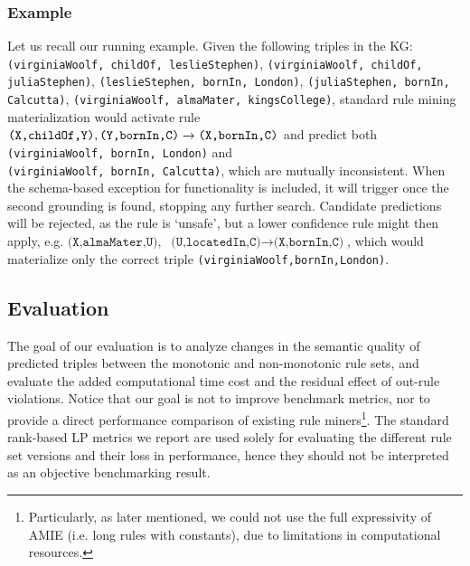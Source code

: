 \documentclass[a4paper,UKenglish,cleveref, autoref, thm-restate]{tgdk-v2021}
\begin{document}
\subsubsection{Example}  Let us recall our running example. Given the following triples in the KG: \texttt{(virginiaWoolf, childOf, leslieStephen)}, \texttt{(virginiaWoolf, childOf, juliaStephen)}, \texttt{(leslieStephen, bornIn, London)}, \texttt{(juliaStephen, bornIn, Calcutta)}, \texttt{(virginiaWoolf, almaMater, kingsCollege)}, standard rule mining materialization would activate rule $\texttt{(X,childOf,Y)}, \texttt{(Y,bornIn,C)} \rightarrow \\ \texttt{(X,bornIn,C)}$ and predict both \texttt{(virginiaWoolf, bornIn, London)} and\\ \texttt{(virginiaWoolf, bornIn, Calcutta)}, which are mutually inconsistent. When the schema-based exception for functionality is included, it will trigger once the second grounding is found, stopping any further search. Candidate predictions will be rejected, as the rule is `unsafe', but a lower confidence rule might then apply, e.g. $\texttt{(X,almaMater,U)}, $ $\texttt{(U,locatedIn,C)} \rightarrow \texttt{(X,bornIn,C)}$, which would materialize only the correct triple \texttt{(virginiaWoolf,bornIn,London)}. 
\subsection{Evaluation}


The goal of our evaluation is to analyze changes in the semantic quality of predicted triples between the monotonic and non-monotonic rule sets, and evaluate the added computational time cost and the residual effect of out-rule violations. Notice that our goal is not to improve benchmark metrics, nor to provide a direct performance comparison of existing rule miners\footnote{Particularly, as later mentioned, we could not use the full expressivity of AMIE (i.e. long rules with constants), due to limitations in computational resources.}. The  standard rank-based LP metrics we  report are used solely for evaluating the different rule set versions and their loss in performance, hence they should not be interpreted as an objective benchmarking result. 
\end{document}
